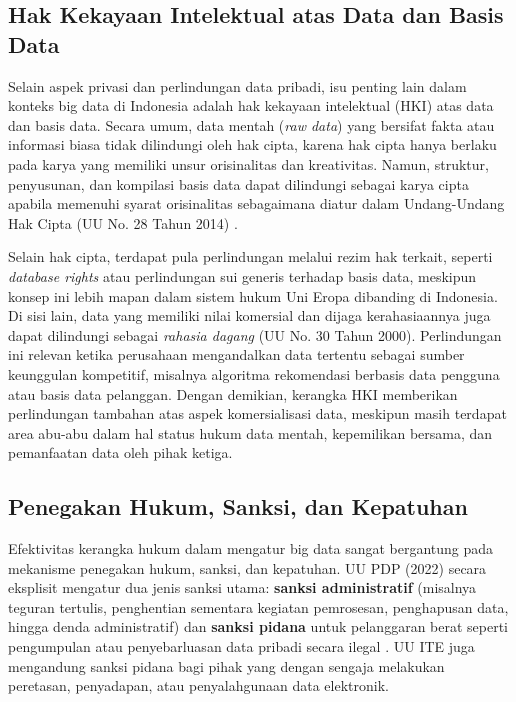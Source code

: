 \subsection{Hak Kekayaan Intelektual atas Data dan Basis Data}

Selain aspek privasi dan perlindungan data pribadi, isu penting lain dalam konteks big data di Indonesia adalah hak kekayaan intelektual (HKI) atas data dan basis data. Secara umum, data mentah (\textit{raw data}) yang bersifat fakta atau informasi biasa tidak dilindungi oleh hak cipta, karena hak cipta hanya berlaku pada karya yang memiliki unsur orisinalitas dan kreativitas. Namun, struktur, penyusunan, dan kompilasi basis data dapat dilindungi sebagai karya cipta apabila memenuhi syarat orisinalitas sebagaimana diatur dalam Undang-Undang Hak Cipta (UU No. 28 Tahun 2014) \cite{hakcipta2014}.  

Selain hak cipta, terdapat pula perlindungan melalui rezim hak terkait, seperti \textit{database rights} atau perlindungan sui generis terhadap basis data, meskipun konsep ini lebih mapan dalam sistem hukum Uni Eropa dibanding di Indonesia. Di sisi lain, data yang memiliki nilai komersial dan dijaga kerahasiaannya juga dapat dilindungi sebagai \textit{rahasia dagang} (UU No. 30 Tahun 2000). Perlindungan ini relevan ketika perusahaan mengandalkan data tertentu sebagai sumber keunggulan kompetitif, misalnya algoritma rekomendasi berbasis data pengguna atau basis data pelanggan. Dengan demikian, kerangka HKI memberikan perlindungan tambahan atas aspek komersialisasi data, meskipun masih terdapat area abu-abu dalam hal status hukum data mentah, kepemilikan bersama, dan pemanfaatan data oleh pihak ketiga.

\subsection{Penegakan Hukum, Sanksi, dan Kepatuhan}

Efektivitas kerangka hukum dalam mengatur big data sangat bergantung pada mekanisme penegakan hukum, sanksi, dan kepatuhan. UU PDP (2022) secara eksplisit mengatur dua jenis sanksi utama: \textbf{sanksi administratif} (misalnya teguran tertulis, penghentian sementara kegiatan pemrosesan, penghapusan data, hingga denda administratif) dan \textbf{sanksi pidana} untuk pelanggaran berat seperti pengumpulan atau penyebarluasan data pribadi secara ilegal \cite{pdp2022}. UU ITE juga mengandung sanksi pidana bagi pihak yang dengan sengaja melakukan peretasan, penyadapan, atau penyalahgunaan data elektronik.  


